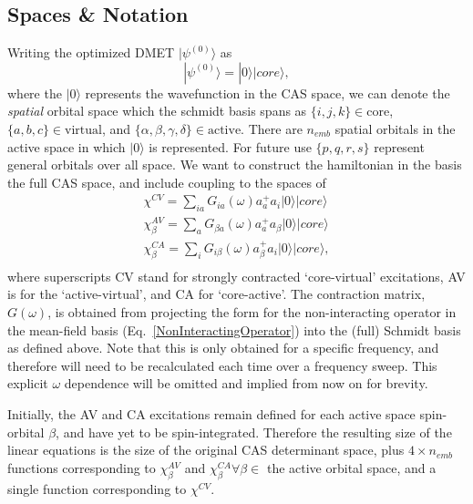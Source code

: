 \documentclass[a4paper,oneside,11pt]{article}
\numberwithin{equation}{section}
\begin{document}
\subsection{Spaces \& Notation}

Writing the optimized DMET $|\psi^{(0)} \rangle$ as
\begin{equation}
|\psi^{(0)} \rangle = |0 \rangle|core \rangle ,
\end{equation}
where the $|0 \rangle$ represents the wavefunction in the CAS space, we can denote the {\em spatial} orbital space which the schmidt basis spans 
as $\{i,j,k\} \in \textrm{core}$, $\{a,b,c\} \in \textrm{virtual}$, and $\{ \alpha,\beta,\gamma,\delta \} \in \textrm{active}$. There are $n_{emb}$ spatial 
orbitals in the active space in which $|0 \rangle$ is represented. For future use $\{p,q,r,s\}$ represent general orbitals over all space.
We want to construct the hamiltonian in the basis the full CAS space, and include coupling to the spaces of
\begin{eqnarray}
\chi^{CV} = \sum_{ia} G_{ia}(\omega) a_a^{+} a_i |0\rangle |core\rangle \\
\chi^{AV}_{\beta} = \sum_{a} G_{\beta a}(\omega) a_a^{+} a_{\beta} |0\rangle |core\rangle \\
\chi^{CA}_{\beta} = \sum_{i} G_{i \beta}(\omega) a_{\beta}^{+} a_{i} |0\rangle |core\rangle , \\
\end{eqnarray}
where superscripts CV stand for strongly contracted `core-virtual' excitations, AV is for the `active-virtual', and CA for `core-active'. The contraction matrix, $G(\omega)$, is obtained from projecting the
form for the non-interacting operator in the mean-field basis (Eq.~\ref{NonInteractingOperator}) into the (full) Schmidt basis as defined above. Note that this is only obtained for a specific
frequency, and therefore will need to be recalculated each time over a frequency sweep. This explicit $\omega$ dependence will be omitted and implied from now on for brevity. 

Initially, the AV and CA excitations remain defined for
each active space spin-orbital $\beta$, and have yet to be spin-integrated. Therefore the resulting size of the linear equations is the size of the original CAS determinant space, plus $4 \times n_{emb}$
functions corresponding to $\chi^{AV}_{\beta}$ and $\chi^{CA}_{\beta} \forall \beta \in$ the active orbital space, and a single function corresponding to $\chi^{CV}$.
\end{document}
